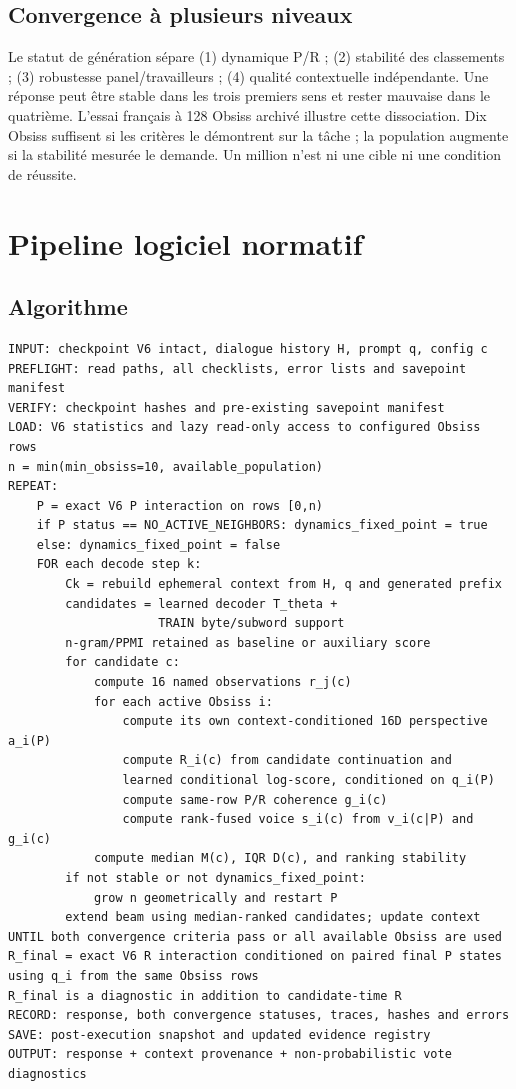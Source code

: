 \documentclass[11pt,a4paper]{report}
\begin{document}
\section{Convergence à plusieurs niveaux}
Le statut de génération sépare (1) dynamique P/R ; (2) stabilité des classements ; (3) robustesse panel/travailleurs ; (4) qualité contextuelle indépendante. Une réponse peut être stable dans les trois premiers sens et rester mauvaise dans le quatrième. L'essai français à 128 Obsiss archivé illustre cette dissociation. Dix Obsiss suffisent si les critères le démontrent sur la tâche ; la population augmente si la stabilité mesurée le demande. Un million n'est ni une cible ni une condition de réussite.

\chapter{Pipeline logiciel normatif}
\section{Algorithme}
\begin{verbatim}
INPUT: checkpoint V6 intact, dialogue history H, prompt q, config c
PREFLIGHT: read paths, all checklists, error lists and savepoint manifest
VERIFY: checkpoint hashes and pre-existing savepoint manifest
LOAD: V6 statistics and lazy read-only access to configured Obsiss rows
n = min(min_obsiss=10, available_population)
REPEAT:
    P = exact V6 P interaction on rows [0,n)
    if P status == NO_ACTIVE_NEIGHBORS: dynamics_fixed_point = true
    else: dynamics_fixed_point = false
    FOR each decode step k:
        Ck = rebuild ephemeral context from H, q and generated prefix
        candidates = learned decoder T_theta +
                     TRAIN byte/subword support
        n-gram/PPMI retained as baseline or auxiliary score
        for candidate c:
            compute 16 named observations r_j(c)
            for each active Obsiss i:
                compute its own context-conditioned 16D perspective a_i(P)
                compute R_i(c) from candidate continuation and
                learned conditional log-score, conditioned on q_i(P)
                compute same-row P/R coherence g_i(c)
                compute rank-fused voice s_i(c) from v_i(c|P) and g_i(c)
            compute median M(c), IQR D(c), and ranking stability
        if not stable or not dynamics_fixed_point:
            grow n geometrically and restart P
        extend beam using median-ranked candidates; update context
UNTIL both convergence criteria pass or all available Obsiss are used
R_final = exact V6 R interaction conditioned on paired final P states
using q_i from the same Obsiss rows
R_final is a diagnostic in addition to candidate-time R
RECORD: response, both convergence statuses, traces, hashes and errors
SAVE: post-execution snapshot and updated evidence registry
OUTPUT: response + context provenance + non-probabilistic vote diagnostics
\end{verbatim}
\end{document}
